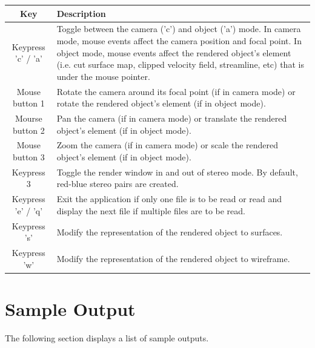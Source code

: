 \begin{table}
\begin{center}
\begin{tabular}{| c | p{13cm} |}
\hline
\textbf{Key} & \textbf{Description} \\ \hline
Keypress 'c' / 'a' & Toggle between the camera ('c') and object ('a')  mode. In 
camera mode, mouse events affect the camera position and focal point. In 
object mode, mouse events affect the rendered object's element (i.e.
cut surface map, clipped velocity field, streamline, etc) that is under the 
mouse pointer.\\ \hline
Mouse button 1 & Rotate the camera around its focal point (if in camera mode) 
or rotate the rendered object's element (if in object mode).\\ \hline
Mourse button 2 & Pan the camera (if in camera mode) or translate the rendered 
object's element (if in object mode). \\ \hline
Mouse button 3 & Zoom the camera (if in camera mode) or scale the rendered 
object's element (if in object mode). \\ \hline
Keypress 3 & Toggle the render window in and out of stereo mode. By default,
red-blue stereo pairs are created. \\ \hline
Keypress 'e' / 'q' & Exit the application if only one file is to be read or 
read and display the next file if multiple files are to be read. \\ \hline
Keypress 's' & Modify the representation of the rendered object to surfaces.
\\ \hline
Keypress 'w' & Modify the representation of the rendered object to wireframe.
\\ \hline
\end{tabular}
\end{center}
\end{table}




\section{Sample Output}
The following section displays a list of sample outputs.  

